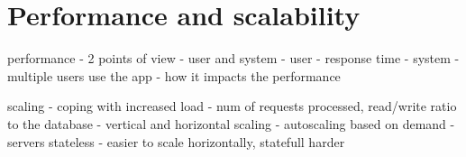 \section{Performance and scalability}

performance - 2 points of view - user and system
- user - response time
- system - multiple users use the app - how it impacts the performance

scaling - coping with increased load - num of requests processed, read/write ratio to the database
- vertical and horizontal scaling - autoscaling based on demand
- servers stateless - easier to scale horizontally, statefull harder





